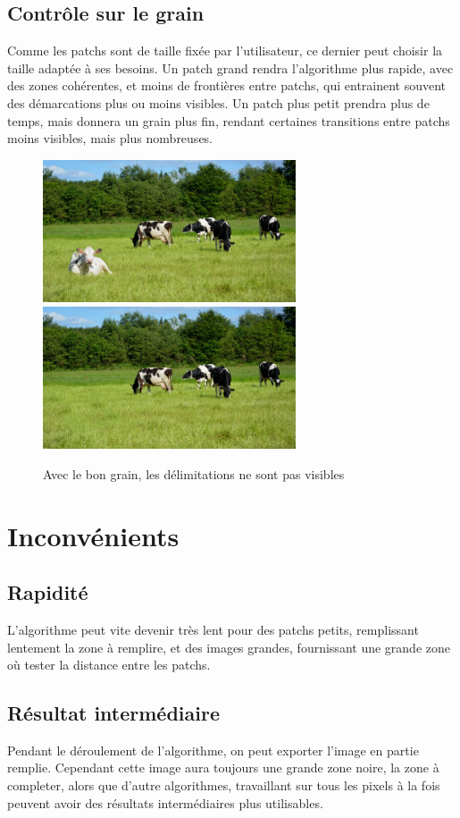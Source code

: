 \subsection{Contrôle sur le grain}
Comme les patchs sont de taille fixée par l'utilisateur, ce dernier peut choisir
la taille adaptée à ses besoins. Un patch grand rendra l'algorithme plus rapide,
avec des zones cohérentes, et moins de frontières entre patchs, qui entrainent
souvent des démarcations plus ou moins visibles. Un patch plus petit prendra
plus de temps, mais donnera un grain plus fin, rendant certaines transitions
entre patchs moins visibles, mais plus nombreuses.

\begin{figure}[ht]
\centering
\includegraphics[width=7.5cm]{img/examples/vache.jpg}
\includegraphics[width=7.5cm]{img/examples/vache_res.jpg}
\caption{Avec le bon grain, les délimitations ne sont pas visibles}
\end{figure}

\section{Inconvénients}
\subsection{Rapidité}
L'algorithme peut vite devenir très lent pour des patchs petits, remplissant lentement
la zone à remplire, et des images grandes, fournissant une grande zone où tester la 
distance entre les patchs.

\subsection{Résultat intermédiaire}
Pendant le déroulement de l'algorithme, on peut exporter l'image en partie remplie.
Cependant cette image aura toujours une grande zone noire, la zone à completer, alors
que d'autre algorithmes, travaillant sur tous les pixels à la fois peuvent avoir des
résultats intermédiaires plus utilisables.

